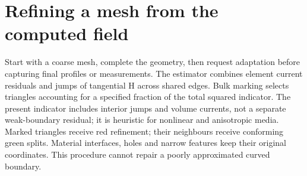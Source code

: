 \section{Refining a mesh from the computed field}
\label{sec:adaptive-mesh}

Start with a coarse mesh, complete the geometry, then request adaptation before
capturing final profiles or measurements. The estimator combines element current
residuals and jumps of tangential H across shared edges. Bulk marking selects
triangles accounting for a specified fraction of the total squared indicator.
The present indicator includes interior jumps and volume currents, not a separate
weak-boundary residual; it is heuristic for nonlinear and anisotropic media.
Marked triangles receive red refinement; their neighbours receive conforming
green splits. Material interfaces, holes and narrow features keep their original
coordinates. This procedure cannot repair a poorly approximated curved boundary.

